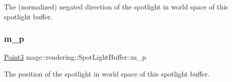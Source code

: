 The (normalized) negated direction of the spotlight in world space of this spotlight buffer. \hypertarget{structmage_1_1rendering_1_1_spot_light_buffer_aea38ba213d99bbdf0c36ce27bc0c64c5}{}\label{structmage_1_1rendering_1_1_spot_light_buffer_aea38ba213d99bbdf0c36ce27bc0c64c5} 
\subsubsection{\texorpdfstring{m\+\_\+p}{m\_p}}
{\footnotesize\ttfamily \hyperlink{structmage_1_1_point3}{Point3} mage\+::rendering\+::\+Spot\+Light\+Buffer\+::m\+\_\+p}

The position of the spotlight in world space of this spotlight buffer. 